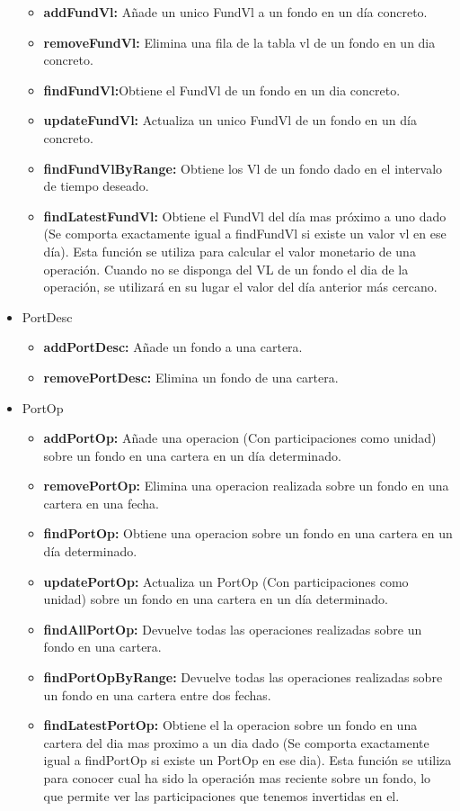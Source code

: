 \documentclass[12pt, a4paper]{article}
\begin{document}
\begin{itemize}
\begin{itemize}
							\item\textbf{addFundVl:} Añade un unico FundVl a un fondo en un día concreto.
							\item\textbf{removeFundVl:} Elimina una fila de la tabla vl de un fondo en un dia concreto.
							\item \textbf{findFundVl:}Obtiene el FundVl de un fondo en un dia concreto.
							\item \textbf{updateFundVl:} Actualiza un unico FundVl de un fondo en un día concreto.
							\item \textbf{findFundVlByRange:} Obtiene los Vl de un fondo dado en el intervalo de tiempo deseado.
							\item \textbf{findLatestFundVl:} Obtiene el FundVl del día mas próximo a uno dado (Se comporta exactamente igual a findFundVl si existe un valor vl en ese día). Esta función se utiliza para calcular el valor monetario de una operación. Cuando no se disponga del \gls{VL} de un fondo el dia de la operación, se utilizará en su lugar el valor del día anterior más cercano.
						\end{itemize}
				
	\item PortDesc
						\begin{itemize}
							\item\textbf{addPortDesc:} Añade un fondo a una cartera.
							\item\textbf{removePortDesc:} Elimina un fondo de una cartera.
						\end{itemize}
	\item PortOp
						\begin{itemize}
							\item\textbf{addPortOp:} Añade una operacion (Con participaciones como unidad) sobre un fondo en una cartera en un día determinado.
							\item\textbf{removePortOp:} Elimina una operacion realizada sobre un fondo en una cartera en una fecha.
							\item \textbf{findPortOp:} Obtiene una operacion sobre un fondo en una cartera en un día determinado.
							\item \textbf{updatePortOp:} Actualiza un PortOp (Con participaciones como unidad) sobre un fondo en una cartera en un día determinado.
							\item \textbf{findAllPortOp:} Devuelve todas las operaciones realizadas sobre un fondo en una cartera.
							\item \textbf{findPortOpByRange:} Devuelve todas las operaciones realizadas sobre un fondo en una cartera entre dos fechas.
							\item \textbf{findLatestPortOp:} Obtiene el la operacion sobre un fondo en una cartera del dia mas proximo a un dia dado (Se comporta exactamente igual a findPortOp si existe un PortOp en ese dia). Esta función se utiliza para conocer cual ha sido la operación mas reciente sobre un fondo, lo que permite ver las participaciones que tenemos invertidas en el.\\
						\end{itemize}
	
\end{itemize}
\end{document}
